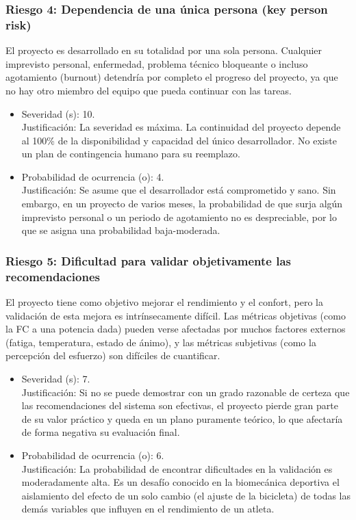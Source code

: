 \documentclass[
11pt, %
]{charter}
\begin{document}
\subsubsection*{Riesgo 4: Dependencia de una única persona (key person risk)}

El proyecto es desarrollado en su totalidad por una sola persona. Cualquier imprevisto personal, enfermedad, problema técnico bloqueante o incluso agotamiento (burnout) detendría por completo el progreso del proyecto, ya que no hay otro miembro del equipo que pueda continuar con las tareas.
\begin{itemize}
    \item Severidad (s): 10.\\
    Justificación: La severidad es máxima. La continuidad del proyecto depende al 100\% de la disponibilidad y capacidad del único desarrollador. No existe un plan de contingencia humano para su reemplazo.
    \item Probabilidad de ocurrencia (o): 4.\\
    Justificación: Se asume que el desarrollador está comprometido y sano. Sin embargo, en un proyecto de varios meses, la probabilidad de que surja algún imprevisto personal o un periodo de agotamiento no es despreciable, por lo que se asigna una probabilidad baja-moderada.
\end{itemize}

\subsubsection*{Riesgo 5: Dificultad para validar objetivamente las recomendaciones}

El proyecto tiene como objetivo mejorar el rendimiento y el confort, pero la validación de esta mejora es intrínsecamente difícil. Las métricas objetivas (como la FC a una potencia dada) pueden verse afectadas por muchos factores externos (fatiga, temperatura, estado de ánimo), y las métricas subjetivas (como la percepción del esfuerzo) son difíciles de cuantificar.
\begin{itemize}
    \item Severidad (s): 7.\\
    Justificación: Si no se puede demostrar con un grado razonable de certeza que las recomendaciones del sistema son efectivas, el proyecto pierde gran parte de su valor práctico y queda en un plano puramente teórico, lo que afectaría de forma negativa su evaluación final.
    \item Probabilidad de ocurrencia (o): 6.\\
    Justificación: La probabilidad de encontrar dificultades en la validación es moderadamente alta. Es un desafío conocido en la biomecánica deportiva el aislamiento del efecto de un solo cambio (el ajuste de la bicicleta) de todas las demás variables que influyen en el rendimiento de un atleta.
\end{itemize}
\end{document}
